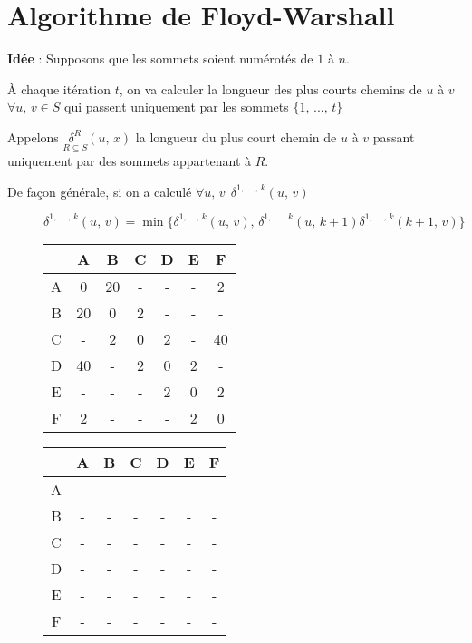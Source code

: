 

\section{Algorithme de Floyd-Warshall}

\textbf{\textcolor{ocre}{Idée}} : Supposons que les sommets soient numérotés de $1$ à $n$.

À chaque itération $t$, on va calculer la longueur des plus courts chemins de $u$ à $v$ $\forall u,\, v \in S$ qui passent uniquement par les sommets $\lbrace 1,\, ... ,\, t\rbrace$

Appelons $\underset{R\subseteq S}{\delta^{R}}(u,\, x)$ la longueur du plus court chemin de $u$ à $v$ passant uniquement par des sommets appartenant à $R$.


De façon générale, si on a calculé $\forall u,\, v \ \ \delta^{1,\,...\,,\,k}(u,\, v)$

\begin{figure}[h]
\centering
$\delta^{1,\,...\,,\,k}(u,\, v) = \min \lbrace \delta^{1,\,...,\,k}(u,\, v),\, \delta^{1,\,...\, ,\,k}(u,\, k+1)\delta^{1,\,...\, ,\,k}(k+1,\, v)\rbrace$
\end{figure}

\newpage

\begin{figure}[h]
\centering
\begin{minipage}{.5\textwidth}
	\centering
	\begin{tabular}{c | c c c c c c}
		  & A & B & C & D & E & F \\ \hline
		A & 0 & 20 & - & - & - & 2 \\
		B & 20 & 0 & 2 & - & - & - \\
		C & - & 2 & 0 & 2 & - & 40 \\
		D & 40 & - & 2 & 0 & 2 & - \\
		E & - & - & - & 2 & 0 & 2 \\
		F & 2 & - & - & - & 2 & 0
	\end{tabular}
\end{minipage}%
\begin{minipage}{.5\textwidth}
	\centering
	\begin{tabular}{c | c c c c c c}
		  & A & B & C & D & E & F \\ \hline
		A & - & - & - & - & - & - \\
		B & - & - & - & - & - & - \\
		C & - & - & - & - & - & - \\
		D & - & - & - & - & - & - \\
		E & - & - & - & - & - & - \\
		F & - & - & - & - & - & - \\
	\end{tabular}
\end{minipage}%
\end{figure}


